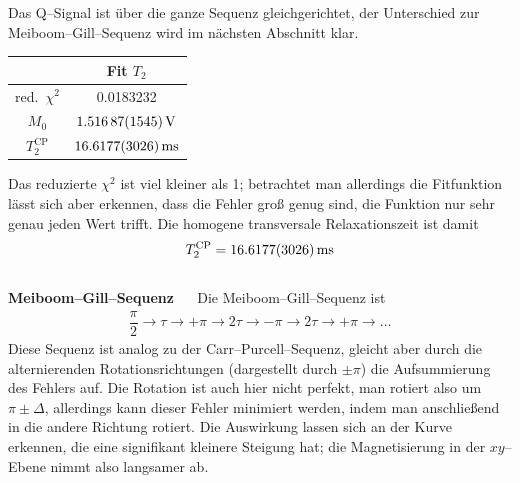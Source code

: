 \documentclass[10pt]{article}
\newenvironment{Figure}
  {\par\medskip\noindent\minipage{\linewidth}}
  {\endminipage\par\medskip}
\begin{document}
\begin{multicols}{2}
Das Q--Signal ist über die ganze Sequenz gleichgerichtet, der Unterschied zur Meiboom--Gill--Sequenz wird im nächsten Abschnitt klar.
  \begin{Figure}
    \centering\resizebox{\textwidth}{!}{}
    \label{fig:cp}
  \end{Figure}
  \begin{center}
    \begin{tabular}{c|c}
    & Fit $T_2$\\
    \hline
    red.\ $\chi ^2$ &  0.0183232\\
    $M_0$ & $\SI{1.51687+-0.01545}{V}$ \\
    $T_2^{\text{CP}}$ & $\SI{16.6177+-0.3026}{ms}$ 
    \end{tabular}
  \label{Tab:mg_para}
  \end{center}
Das reduzierte $\chi ^2$ ist viel kleiner als 1; betrachtet man allerdings die Fitfunktion lässt sich aber erkennen, dass die Fehler groß genug sind, die Funktion nur sehr genau jeden Wert trifft.
Die homogene transversale Relaxationszeit ist damit
\begin{align} 
        T_2^{\text{CP}}=\SI{16.6177+-0.3026}{ms}
\end{align} 
\\\textbf{Meiboom--Gill--Sequenz} $\quad$ 
Die Meiboom--Gill--Sequenz ist 
\begin{align} 
        \dfrac{\pi }{2}\rightarrow \tau \rightarrow +\pi \rightarrow 2\tau \rightarrow -\pi \rightarrow 2\tau \rightarrow +\pi \rightarrow \hdots 
\end{align} 
Diese Sequenz ist analog zu der Carr--Purcell--Sequenz, gleicht aber durch die alternierenden Rotationsrichtungen (dargestellt durch $\pm \pi $) die Aufsummierung des Fehlers auf.
Die Rotation ist auch hier nicht perfekt, man rotiert also um $\pi \pm \Delta $, allerdings kann dieser Fehler minimiert werden, indem man anschließend in die andere Richtung rotiert.
Die Auswirkung lassen sich an der Kurve erkennen, die eine signifikant kleinere Steigung hat; die Magnetisierung in der $xy$--Ebene nimmt also langsamer ab.


\end{multicols}
\end{document}
